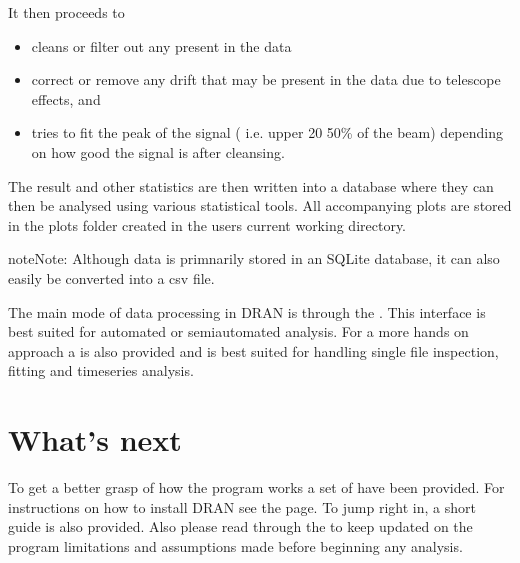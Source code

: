 \documentclass[letterpaper,10pt,english]{sphinxmanual}
\begin{document}
\sphinxAtStartPar
It then proceeds to
\begin{itemize}
\item {} 
\sphinxAtStartPar
cleans or filter out any {\hyperref[\detokenize{extras/rfi::doc}]{}} present in the data

\item {} 
\sphinxAtStartPar
correct or remove any drift that may be present in the data due to telescope effects, and

\item {} 
\sphinxAtStartPar
tries to fit the peak of the signal ( i.e. upper 20 \sphinxhyphen{} 50\% of the beam) depending on how good the signal is after cleansing.

\end{itemize}

\sphinxAtStartPar
The result and other statistics are then written
into a database where they can then be analysed using various statistical tools.
All accompanying plots are stored in the plots folder created in the users current working directory.

\begin{sphinxadmonition}{note}{Note:}
\sphinxAtStartPar
Although data is primnarily stored in an SQLite database, it can also easily be converted into
a csv file.
\end{sphinxadmonition}

\sphinxAtStartPar
The main mode of data processing in DRAN is through the {\hyperref[\detokenize{extras/cli::doc}]{}}. This interface is best suited for
automated or semi\sphinxhyphen{}automated analysis. For a more hands on approach a
{\hyperref[\detokenize{extras/gui::doc}]{}} is also provided
and is best suited for handling single file inspection, fitting and timeseries analysis.


\chapter{What’s next}
\label{\detokenize{index:what-s-next}}
\sphinxAtStartPar
To get a better grasp of how the program works a set of {\hyperref[\detokenize{extras/tuts/tutorials::doc}]{}} have been provided.
For instructions on how to install DRAN
see the {\hyperref[\detokenize{extras/installation::doc}]{}} page. To jump right in,
a short {\hyperref[\detokenize{extras/quickstart::doc}]{}} guide is also provided.
Also please read through the {\hyperref[\detokenize{extras/caveats::doc}]{}} to keep updated
on the program limitations and assumptions made before beginning any analysis.
\end{document}
